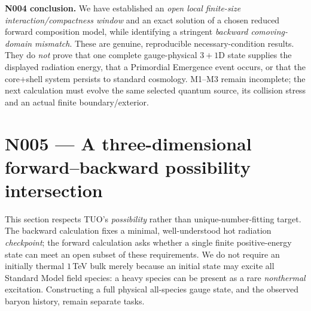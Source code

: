 \documentclass[11pt,a4paper]{article}
\theoremstyle{tmon}
\theoremstyle{definition}
\begin{document}
\begin{warningbox}
\textbf{N004 conclusion.} We have established an \emph{open local finite-size interaction/compactness window} and an exact solution of a chosen reduced forward composition model, while identifying a stringent \emph{backward comoving-domain mismatch}. These are genuine, reproducible necessary-condition results. They do \emph{not} prove that one complete gauge-physical $3+1$D state supplies the displayed radiation energy, that a Primordial Emergence event occurs, or that the core+shell system persists to standard cosmology. M1--M3 remain incomplete; the next calculation must evolve the same selected quantum source, its collision stress and an actual finite boundary/exterior.
\end{warningbox}



\clearpage
\section{N005 --- A three-dimensional forward--backward possibility intersection}\label{sec:n005}
This section respects TUO's \emph{possibility} rather than unique-number-fitting target. The backward calculation fixes a minimal, well-understood hot radiation \emph{checkpoint}; the forward calculation asks whether a single finite positive-energy state can meet an open subset of these requirements. We do not require an initially thermal $1\,$TeV bulk merely because an initial state may excite all Standard Model field species: a heavy species can be present as a rare \emph{nonthermal} excitation. Constructing a full physical all-species gauge state, and the observed baryon history, remain separate tasks.
\end{document}
